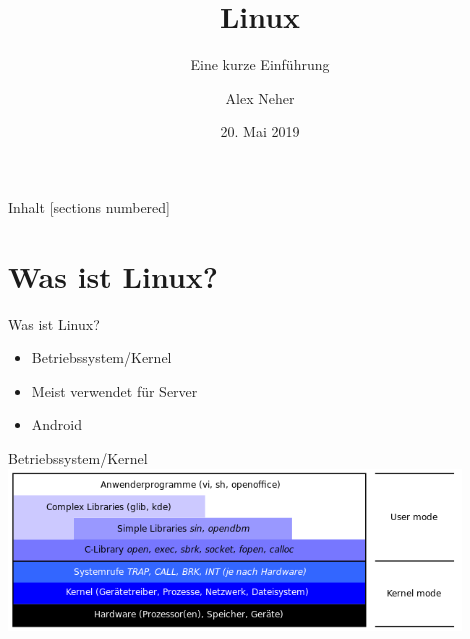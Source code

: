 \documentclass[10pt]{beamer}
\title{Linux}
\subtitle{Eine kurze Einführung}
\date{20. Mai 2019}
\author{Alex Neher}
\begin{document}
\pagestyle{empty}
	
\begin{frame}

\end{frame}

\maketitle

\begin{frame}{Inhalt}
  [sections numbered]
  \tableofcontents[hideallsubsections]
\end{frame}

\section{Was ist Linux?}

\begin{frame}{Was ist Linux?}
    \begin{itemize}[<+- | alert@+>]
        \item Betriebssystem/Kernel
        \item Meist verwendet für Server
        \item Android
    \end{itemize}

\end{frame}

\begin{frame}{Betriebssystem/Kernel}
    \centering
    \includegraphics[keepaspectratio,width=0.9\textwidth]{img/kernel_schichten.png}
\end{frame}
\end{document}
